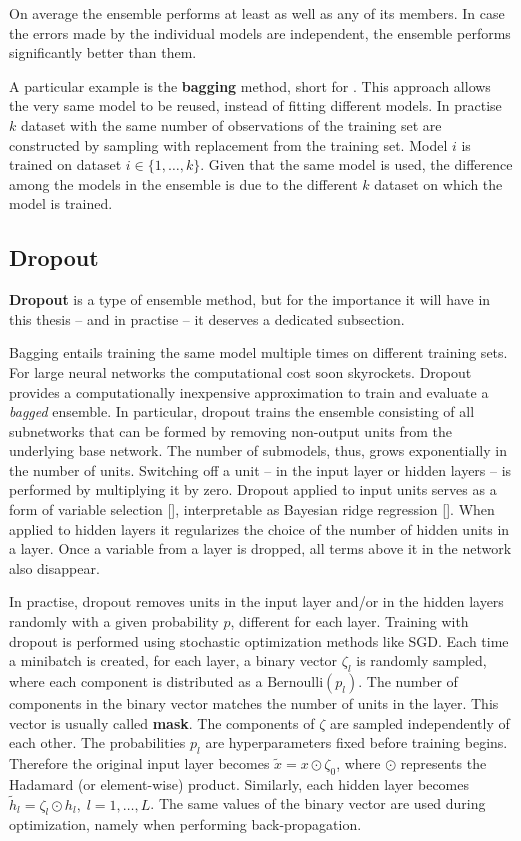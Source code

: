On average the ensemble performs at least as well as any of its members. In case the errors made by the individual models are independent, the ensemble performs significantly better than them.

A particular example is the \textbf{bagging} method, short for . This approach allows the very same model to be reused, instead of fitting different models. In practise $k$ dataset with the same number of observations of the training set are constructed by sampling with replacement from the training set. Model $i$ is trained on dataset $i \in \{1, \dots, k\}$. Given that the same model is used, the difference among the models in the ensemble is due to the different $k$  dataset on which the model is trained.



\subsection{Dropout}
\textbf{Dropout} is a type of ensemble method, but for the importance it will have in this thesis -- and in practise -- it deserves a dedicated subsection. 

Bagging entails training the same model multiple times on different training sets. For large neural networks the computational cost soon skyrockets. Dropout provides a computationally inexpensive approximation to train and evaluate a \textit{bagged} ensemble. In particular, dropout trains the ensemble consisting of all subnetworks that can be formed by removing non-output units from the underlying base network. The number of submodels, thus, grows exponentially in the number of units. Switching off a unit -- in the input layer or hidden layers -- is performed by multiplying it by zero. Dropout applied to input units serves as a form of variable selection [\cite{Hinton2006, Srivastava2014}], interpretable as Bayesian ridge regression [\cite{Polson2017}]. When applied to hidden layers it regularizes the choice of the number of hidden units in a layer. Once a variable from a layer is dropped, all terms above it in the network also disappear.

In practise, dropout removes units in the input layer and/or in the hidden layers randomly with a given
probability $p$, different for each layer. Training with dropout is performed using stochastic optimization methods like SGD. Each time a minibatch is created, for each layer, a binary vector $\zeta_l$ is randomly sampled, where each component is distributed as a $\mathrm{Bernoulli}(p_l)$. The number of components in the binary vector matches the number of units in the layer. This vector is usually called \textbf{mask}. The components of $\zeta$ are sampled independently of each other. The probabilities $p_l$ are hyperparameters fixed before training begins. Therefore the original input layer becomes $\tilde{x} = x \odot \zeta_0$, where $\odot$ represents the Hadamard (or element-wise) product. Similarly, each hidden layer becomes $\tilde{h}_l = \zeta_l \odot h_l, \; l = 1, \dots, L$. The same values of the binary vector are used during optimization, namely when performing back-propagation. 

